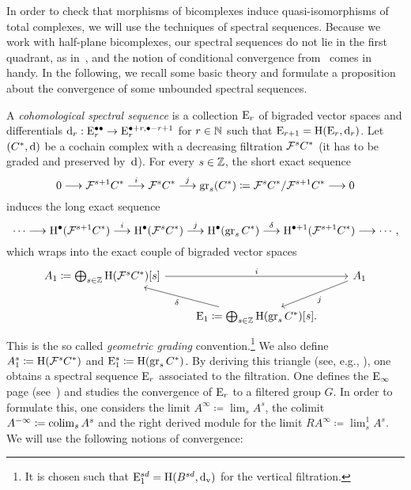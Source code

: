 \documentclass[\MainFolder/Text.tex]{subfiles}
\begin{document}
In order to check that morphisms of bicomplexes induce quasi-isomorphisms of total complexes, we will use the techniques of spectral sequences. Because we work with half-plane bicomplexes, our spectral sequences do not lie in the first quadrant, as in~\cite{Weibel1994}, and the notion of conditional convergence from~\cite{Boardmann1999} comes in handy. In the following, we recall some basic theory and formulate a proposition about the convergence of some unbounded spectral sequences.

A \emph{cohomological spectral sequence} is a collection $\mathrm{E}_r$ of bigraded vector spaces and differentials $\mathrm{d}_{r}: \mathrm{E}_r^{\bullet\bullet} \rightarrow \mathrm{E}_r^{\bullet+r,\bullet-r+1}$ for $r\in \mathbb{N}$ such that $\mathrm{E}_{r+1} = \mathrm{H}(\mathrm{E}_r,\mathrm{d}_r)$. Let $(C^*,\mathrm{d})$ be a cochain complex with a decreasing filtration $\mathcal{F}^s C^*$ (it has to be graded and preserved by~$\mathrm{d}$). For every $s\in \mathbb{Z}$, the short exact sequence
\[ 0\longrightarrow \mathcal{F}^{s+1} C^* \overset{i}{\longrightarrow} \mathcal{F}^s C^* \overset{j}{\longrightarrow} \operatorname{\mathrm{gr}}_s(C^*) \coloneqq \mathcal{F}^{s} C^* / \mathcal{F}^{s+1} C^* \longrightarrow 0 \]
induces the long exact sequence
\[\dotsb \longrightarrow \mathrm{H}^\bullet(\mathcal{F}^{s+1} C^*) \overset{i}{\longrightarrow}  \mathrm{H}^\bullet(\mathcal{F}^{s} C^*) \overset{j}{\longrightarrow} \mathrm{H}^\bullet(\operatorname{\mathrm{gr}}_s C^*) \overset{\delta}{\longrightarrow} \mathrm{H}^{\bullet+1}(\mathcal{F}^{s+1} C^*) \longrightarrow \dotsb, \]
which wraps into the exact couple of bigraded vector spaces
\[\begin{tikzcd}
A_1 \coloneqq \bigoplus_{s\in \Z} \H(\Filtr^s C^*)[s]  \arrow{rr}{i} && A_1 \arrow{dl}{j}\\
 & \SSPage_1 \coloneqq \bigoplus_{s\in \Z} \H(\Gr_s C^*)[s] \arrow{ul}{\delta}.
\end{tikzcd}\]
This is the so called \emph{geometric grading} convention.\footnote{It is chosen such that $\mathrm{E}_1^{sd} = \mathrm{H}(B^{sd},\mathrm{d}_{\mathrm{v}})$ for the vertical filtration.} We also define $A_1^s \coloneqq \mathrm{H}(\mathcal{F}^s C^*)$ and $\mathrm{E}_1^s \coloneqq \mathrm{H}(\operatorname{\mathrm{gr}}_s C^*)$. By deriving this triangle (see, e.g., \cite{Cieliebak2013}), one obtains a spectral sequence $\mathrm{E}_r$ associated to the filtration. One defines the $\mathrm{E}_\infty$ page (see~\cite{Boardmann1999}) and studies the convergence of $\mathrm{E}_r$ to a filtered group $G$. In order to formulate this, one considers the limit $A^\infty \coloneqq \lim_s A^s$, the colimit $A^{-\infty} \coloneqq \operatorname{colim}_s A^s$ and the right derived module for the limit $RA^\infty \coloneqq \lim_s^1 A^s$. We will use the following notions of convergence:
\end{document}
